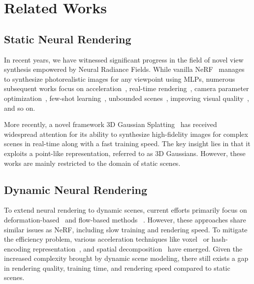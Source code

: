 \section{Related Works}
\subsection{Static Neural Rendering}
In recent years, we have witnessed significant progress in the field of novel view synthesis empowered by Neural Radiance Fields. While vanilla NeRF~\cite{NeRF} manages to synthesize photorealistic images for any viewpoint using MLPs, numerous subsequent works focus on acceleration~\cite{Plenoxels, EfficientNeRF, SNeRF, Instant-NGP}, real-time rendering~\cite{MobileNeRF, PlenOctrees}, camera parameter optimization~\cite{NoPe-NeRF, BARF, FF-NeRF}, few-shot learning~\cite{FDNeRFF, FreeNeRF, pixelNeRF}, unbounded scenes~\cite{Mip-NeRF360, Omni-NeRF}, improving visual quality~\cite{Mip-NeRF, Zip-NeRF}, and so on.

More recently, a novel framework 3D Gaussian Splatting~\cite{3D-GS} has received widespread attention for its ability to synthesize high-fidelity images for complex scenes in real-time along with a fast training speed. The key insight lies in that it exploits a point-like representation, referred to as 3D Gaussians. However, these works are mainly restricted to the domain of static scenes.

\subsection{Dynamic Neural Rendering}

To extend neural rendering to dynamic scenes, current efforts primarily focus on deformation-based~\cite{D-NeRF, HyperNeRF, NR-NeRF} and flow-based methods ~\cite{DyNeRF, NSFF, NeRFlow, VideoNeRF}. However, these approaches share similar issues as NeRF, including slow training and rendering speed. To mitigate the efficiency problem, various acceleration techniques like voxel~\cite{TiNeuVox, DeVRF} or hash-encoding representation~\cite{TI-DNeRF}, and spatial decomposition~\cite{KPlanes, Tensor4D, HexPlane, D2NeRF} have emerged. Given the increased complexity brought by dynamic scene modeling, there still exists a gap in rendering quality, training time, and rendering speed compared to static scenes. 


